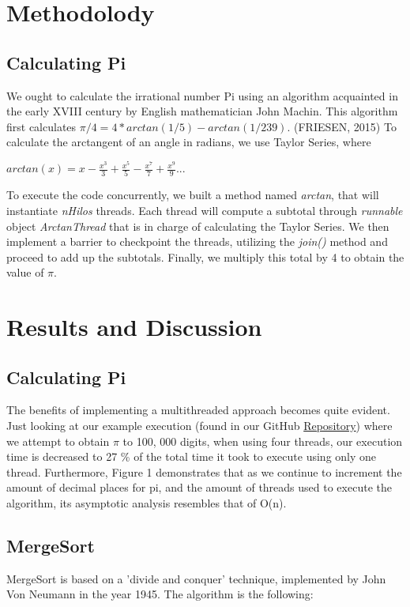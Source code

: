 \documentclass[10pt,a4paper]{article}
\theoremstyle{definition}
\begin{document}
\section{Methodolody}
\subsection{Calculating Pi}
We ought to calculate the irrational number Pi using an algorithm acquainted in the early XVIII century by English mathematician John Machin. This algorithm first calculates \(\pi/4 = 4 * arctan(1/5) - arctan(1/239)\). (FRIESEN, 2015)\cite{FRIESEN2015} To calculate the arctangent of an angle in radians, we use Taylor Series, where\\
\begin{center}\(arctan(x) = x - \frac{x^3}{3} + \frac{x^5}{5} - \frac{x^7}{7} + \frac{x^9}{9} ...\)\end{center}
To execute the code concurrently, we built a method named \emph{arctan}, that will instantiate \emph{nHilos} threads. Each thread will compute a subtotal through \emph{runnable} object \emph{ArctanThread} that is in charge of calculating the Taylor Series. We then implement a barrier to checkpoint the threads, utilizing the \emph{join()} method and proceed to add up the subtotals. Finally, we multiply this total by 4 to obtain the value of \(\pi\).

\section{Results and Discussion}
\subsection{Calculating Pi}

The benefits of implementing a multithreaded approach becomes quite evident. Just looking at our example execution (found in our GitHub \href{https://github.com/ezevallos/CC462_EjemplosConcurrencia}{Repository}) where we attempt to obtain \(\pi\) to 100, 000 digits, when using four threads, our execution time is decreased to 27 \% of the total time it took to execute using only one thread. Furthermore, Figure 1 demonstrates that as we continue to increment the amount of decimal places for pi, and the amount of threads used to execute the algorithm, its asymptotic analysis resembles that of O(n).

\subsection{MergeSort}
MergeSort is based on a 'divide and conquer' technique, implemented by John Von Neumann in the year 1945. The algorithm is the following:
\end{document}
